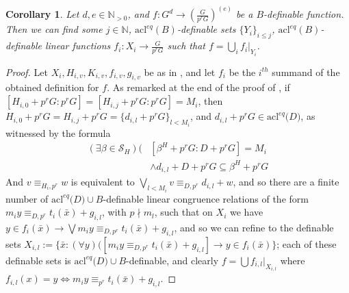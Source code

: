 \documentclass[a4paper,11pt]{article}
\newtheorem{corollary}[theorem]{Corollary}
\renewcommand{\iff}{\Longleftrightarrow}
\newcommand{\cs}{\textopencorner}
\newcommand{\ce}{\textcorner}
\newcommand{\acl}{\textrm{acl}}
\begin{document}
\begin{corollary}\label{nonuniform main for prG}
	Let $d,e\in\mathbb{N}_{>0}$, and $f:G^d\rightarrow (\frac{G}{p^rG})^{(e)}$ be a $B$-definable function. Then we can find some $j\in \mathbb{N}$, $\acl^{eq}(B)$-definable sets $\{Y_i\}_{i\leq j}$, $\acl^{eq}(B)$-definable linear functions $f_i:X_i\rightarrow \frac{G}{p^rG}$ such that $f = \bigcup_if_i|_{Y_i}$.
\end{corollary}
\begin{proof}
	Let $X_i, H_{i,v}, K_{i,v}, f_{i,v}, g_{i,v}$ be as in , and let $f_i$ be the $i^{th}$ summand of the obtained definition for $f$. As remarked at the end of the proof of , if $[H_{i,0}+p^rG:p^rG]=[H_{i,j}+p^rG:p^rG]=M_i$, then $H_{i,0}+p^rG=H_{i,j}+p^rG = \{d_{i,l}+p^rG\}_{l<M_i}$, and $d_{i,l}+p^rG \in\acl^{eq}($\cs$D$\ce$)$, as witnessed by the formula
	\begin{align*}
		(\exists \beta\in \mathcal{S}_H)(&[\beta^H+p^rG:D+p^rG] = M_i \\
		&\wedge d_{i,l}+D+p^rG \subseteq \beta^H+p^rG
	\end{align*}
	And $v\equiv_{H_i,p^r}w$ is equivalent to $\bigvee\limits_{l<M_i}v\equiv_{D,p^r}d_{i,l}+w$, and so there are a finite number of $\acl^{eq}($\cs$D$\ce$)\cup B$-definable linear congruence relations of the form $m_iy \equiv_{D,p^r}t_i(\bar x)+g_{i,l}$, with $p\nmid m_l$, such that on $X_i$ we have $y\in f_i(\bar x)\rightarrow \bigvee m_iy \equiv_{D,p^r}t_i(\bar x)+g_{i,l} $, and so we can refine to the definable sets $X_{i,l} := \{\bar x :  (\forall y) ([m_iy \equiv_{D,p^r}t_i(\bar x)+g_{i,l}]\rightarrow y\in f_i(\bar x)\}$; each of these definable sets is $\acl^{eq}($\cs$D$\ce$)\cup B$-definable, and clearly $f =\bigcup f_{i,l}|_{X_{i,l}}$ where $f_{i,l}(x) = y\iff m_iy \equiv_{p^r}t_i(\bar x)+g_{i,l}$.
	
\end{proof}
\end{document}
